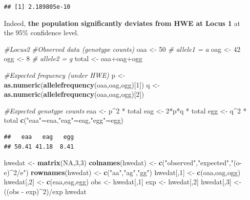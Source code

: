 \documentclass[]{article}
\newenvironment{Shaded}{\begin{snugshade}}{\end{snugshade}}
\newcommand{\KeywordTok}[1]{\textcolor[rgb]{0.13,0.29,0.53}{\textbf{{#1}}}}
\newcommand{\DecValTok}[1]{\textcolor[rgb]{0.00,0.00,0.81}{{#1}}}
\newcommand{\StringTok}[1]{\textcolor[rgb]{0.31,0.60,0.02}{{#1}}}
\newcommand{\CommentTok}[1]{\textcolor[rgb]{0.56,0.35,0.01}{\textit{{#1}}}}
\newcommand{\OtherTok}[1]{\textcolor[rgb]{0.56,0.35,0.01}{{#1}}}
\newcommand{\NormalTok}[1]{{#1}}
\begin{document}
\begin{verbatim}
## [1] 2.189805e-10
\end{verbatim}

Indeed, \textbf{the population significantly deviates from HWE at Locus
1} at the 95\% confidence level.

\begin{Shaded}
\begin{Highlighting}[]
\CommentTok{#Locus2}
\CommentTok{#Observed data (genotype counts)}
\NormalTok{oaa <-}\StringTok{ }\DecValTok{50}     \CommentTok{# allele1 = a}
\NormalTok{oag <-}\StringTok{ }\DecValTok{42}
\NormalTok{ogg <-}\StringTok{ }\DecValTok{8}     \CommentTok{# allele2 = g}
\NormalTok{total <-}\StringTok{ }\NormalTok{oaa+oag+ogg}

\CommentTok{#Expected frequency (under HWE)}
\NormalTok{p <-}\StringTok{ }\KeywordTok{as.numeric}\NormalTok{(}\KeywordTok{allelefrequency}\NormalTok{(oaa,oag,ogg)[}\DecValTok{1}\NormalTok{])}
\NormalTok{q <-}\StringTok{ }\KeywordTok{as.numeric}\NormalTok{(}\KeywordTok{allelefrequency}\NormalTok{(oaa,oag,ogg)[}\DecValTok{2}\NormalTok{])}

\CommentTok{#Expected genotype counts}
\NormalTok{eaa <-}\StringTok{ }\NormalTok{p^}\DecValTok{2} \NormalTok{*}\StringTok{ }\NormalTok{total}
\NormalTok{eag <-}\StringTok{ }\DecValTok{2}\NormalTok{*p*q *}\StringTok{ }\NormalTok{total}
\NormalTok{egg <-}\StringTok{ }\NormalTok{q^}\DecValTok{2} \NormalTok{*}\StringTok{ }\NormalTok{total}
\KeywordTok{c}\NormalTok{(}\StringTok{"eaa"}\NormalTok{=eaa,}\StringTok{"eag"}\NormalTok{=eag,}\StringTok{"egg"}\NormalTok{=egg)}
\end{Highlighting}
\end{Shaded}

\begin{verbatim}
##   eaa   eag   egg 
## 50.41 41.18  8.41
\end{verbatim}

\begin{Shaded}
\begin{Highlighting}[]
\NormalTok{hwedat <-}\StringTok{ }\KeywordTok{matrix}\NormalTok{(}\OtherTok{NA}\NormalTok{,}\DecValTok{3}\NormalTok{,}\DecValTok{3}\NormalTok{)}
\KeywordTok{colnames}\NormalTok{(hwedat) <-}\StringTok{ }\KeywordTok{c}\NormalTok{(}\StringTok{"observed"}\NormalTok{,}\StringTok{"expected"}\NormalTok{,}\StringTok{"(o-e)^2/e"}\NormalTok{)}
\KeywordTok{rownames}\NormalTok{(hwedat) <-}\StringTok{ }\KeywordTok{c}\NormalTok{(}\StringTok{"aa"}\NormalTok{,}\StringTok{"ag"}\NormalTok{,}\StringTok{"gg"}\NormalTok{)}
\NormalTok{hwedat[,}\DecValTok{1}\NormalTok{] <-}\StringTok{ }\KeywordTok{c}\NormalTok{(oaa,oag,ogg)}
\NormalTok{hwedat[,}\DecValTok{2}\NormalTok{] <-}\StringTok{ }\KeywordTok{c}\NormalTok{(eaa,eag,egg)}
\NormalTok{obs <-}\StringTok{ }\NormalTok{hwedat[,}\DecValTok{1}\NormalTok{]}
\NormalTok{exp <-}\StringTok{ }\NormalTok{hwedat[,}\DecValTok{2}\NormalTok{]}
\NormalTok{hwedat[,}\DecValTok{3}\NormalTok{] <-}\StringTok{ }\NormalTok{((obs -}\StringTok{ }\NormalTok{exp)^}\DecValTok{2}\NormalTok{)/exp}
\NormalTok{hwedat}
\end{Highlighting}
\end{Shaded}
\end{document}
